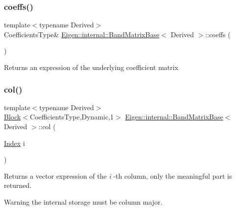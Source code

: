\subsubsection{\texorpdfstring{coeffs()}{coeffs()}\hspace{0.1cm}{\footnotesize\ttfamily [2/2]}}
{\footnotesize\ttfamily template$<$typename Derived$>$ \\
Coefficients\+Type\& \mbox{\hyperlink{class_eigen_1_1internal_1_1_band_matrix_base}{Eigen\+::internal\+::\+Band\+Matrix\+Base}}$<$ Derived $>$\+::coeffs (\begin{DoxyParamCaption}{ }\end{DoxyParamCaption})\hspace{0.3cm}{\ttfamily [inline]}}

\begin{DoxyReturn}{Returns}
an expression of the underlying coefficient matrix 
\end{DoxyReturn}
\mbox{\label{class_eigen_1_1internal_1_1_band_matrix_base_aca78a4990b6827b0b3086e28e6ae4257}} 
\subsubsection{\texorpdfstring{col()}{col()}}
{\footnotesize\ttfamily template$<$typename Derived$>$ \\
\mbox{\hyperlink{class_eigen_1_1_block}{Block}}$<$Coefficients\+Type,Dynamic,1$>$ \mbox{\hyperlink{class_eigen_1_1internal_1_1_band_matrix_base}{Eigen\+::internal\+::\+Band\+Matrix\+Base}}$<$ Derived $>$\+::col (\begin{DoxyParamCaption}\item[{\mbox{\hyperlink{struct_eigen_1_1_eigen_base_a554f30542cc2316add4b1ea0a492ff02}{Index}}}]{i }\end{DoxyParamCaption})\hspace{0.3cm}{\ttfamily [inline]}}

\begin{DoxyReturn}{Returns}
a vector expression of the {\itshape i} -\/th column, only the meaningful part is returned. 
\end{DoxyReturn}
\begin{DoxyWarning}{Warning}
the internal storage must be column major. 
\end{DoxyWarning}
\mbox{\label{class_eigen_1_1internal_1_1_band_matrix_base_a7b0b45c7351847696c911ce8aa2abbdb}} 

